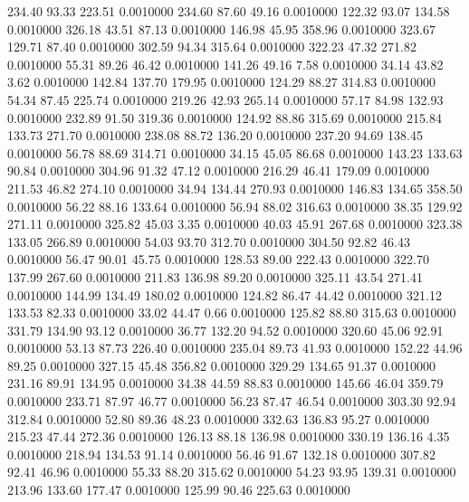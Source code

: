  234.40   93.33  223.51   0.0010000
 234.60   87.60   49.16   0.0010000
 122.32   93.07  134.58   0.0010000
 326.18   43.51   87.13   0.0010000
 146.98   45.95  358.96   0.0010000
 323.67  129.71   87.40   0.0010000
 302.59   94.34  315.64   0.0010000
 322.23   47.32  271.82   0.0010000
  55.31   89.26   46.42   0.0010000
 141.26   49.16    7.58   0.0010000
  34.14   43.82    3.62   0.0010000
 142.84  137.70  179.95   0.0010000
 124.29   88.27  314.83   0.0010000
  54.34   87.45  225.74   0.0010000
 219.26   42.93  265.14   0.0010000
  57.17   84.98  132.93   0.0010000
 232.89   91.50  319.36   0.0010000
 124.92   88.86  315.69   0.0010000
 215.84  133.73  271.70   0.0010000
 238.08   88.72  136.20   0.0010000
 237.20   94.69  138.45   0.0010000
  56.78   88.69  314.71   0.0010000
  34.15   45.05   86.68   0.0010000
 143.23  133.63   90.84   0.0010000
 304.96   91.32   47.12   0.0010000
 216.29   46.41  179.09   0.0010000
 211.53   46.82  274.10   0.0010000
  34.94  134.44  270.93   0.0010000
 146.83  134.65  358.50   0.0010000
  56.22   88.16  133.64   0.0010000
  56.94   88.02  316.63   0.0010000
  38.35  129.92  271.11   0.0010000
 325.82   45.03    3.35   0.0010000
  40.03   45.91  267.68   0.0010000
 323.38  133.05  266.89   0.0010000
  54.03   93.70  312.70   0.0010000
 304.50   92.82   46.43   0.0010000
  56.47   90.01   45.75   0.0010000
 128.53   89.00  222.43   0.0010000
 322.70  137.99  267.60   0.0010000
 211.83  136.98   89.20   0.0010000
 325.11   43.54  271.41   0.0010000
 144.99  134.49  180.02   0.0010000
 124.82   86.47   44.42   0.0010000
 321.12  133.53   82.33   0.0010000
  33.02   44.47    0.66   0.0010000
 125.82   88.80  315.63   0.0010000
 331.79  134.90   93.12   0.0010000
  36.77  132.20   94.52   0.0010000
 320.60   45.06   92.91   0.0010000
  53.13   87.73  226.40   0.0010000
 235.04   89.73   41.93   0.0010000
 152.22   44.96   89.25   0.0010000
 327.15   45.48  356.82   0.0010000
 329.29  134.65   91.37   0.0010000
 231.16   89.91  134.95   0.0010000
  34.38   44.59   88.83   0.0010000
 145.66   46.04  359.79   0.0010000
 233.71   87.97   46.77   0.0010000
  56.23   87.47   46.54   0.0010000
 303.30   92.94  312.84   0.0010000
  52.80   89.36   48.23   0.0010000
 332.63  136.83   95.27   0.0010000
 215.23   47.44  272.36   0.0010000
 126.13   88.18  136.98   0.0010000
 330.19  136.16    4.35   0.0010000
 218.94  134.53   91.14   0.0010000
  56.46   91.67  132.18   0.0010000
 307.82   92.41   46.96   0.0010000
  55.33   88.20  315.62   0.0010000
  54.23   93.95  139.31   0.0010000
 213.96  133.60  177.47   0.0010000
 125.99   90.46  225.63   0.0010000
